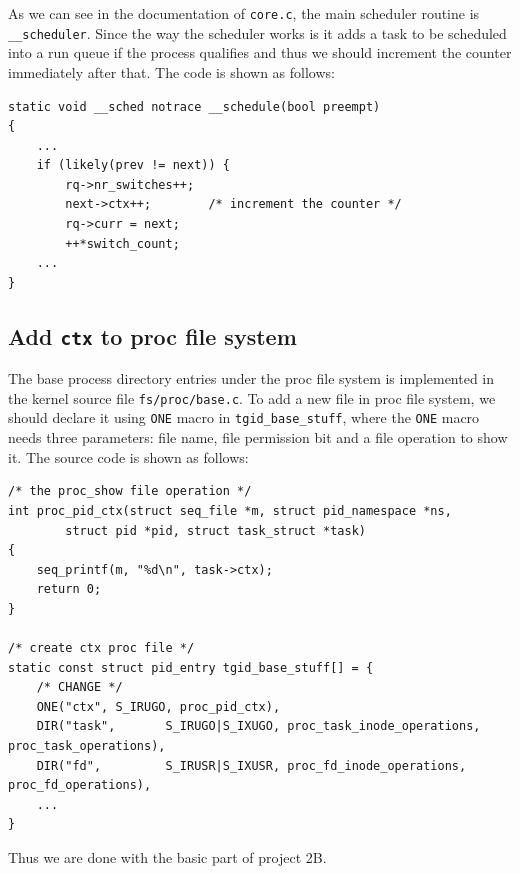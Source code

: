 \documentclass{article}
\begin{document}
As we can see in the documentation of {\tt core.c}, the main scheduler routine is {\tt \_\_scheduler}. Since the way the scheduler works is it adds a task to be scheduled into a run queue if the process qualifies and thus we should increment the counter immediately after that. The code is shown as follows:
\begin{lstlisting}[caption=Increment the counter on scheduling]
static void __sched notrace __schedule(bool preempt)
{
	...
	if (likely(prev != next)) {
		rq->nr_switches++;
		next->ctx++;		/* increment the counter */
		rq->curr = next;
		++*switch_count;
	...
}
\end{lstlisting}

\subsection{Add {\tt ctx} to proc file system}
The base process directory entries under the proc file system is implemented in the kernel source file {\tt fs/proc/base.c}. To add a new file in proc file system, we should declare it using {\tt ONE} macro in {\tt tgid\_base\_stuff}, where the {\tt ONE} macro needs three parameters: file name, file permission bit and a file operation to show it. The source code is shown as follows:
\begin{lstlisting}[caption=Create ctx file under proc file system]
/* the proc_show file operation */
int proc_pid_ctx(struct seq_file *m, struct pid_namespace *ns,
		struct pid *pid, struct task_struct *task)
{
	seq_printf(m, "%d\n", task->ctx);
	return 0;
}

/* create ctx proc file */
static const struct pid_entry tgid_base_stuff[] = {
	/* CHANGE */
	ONE("ctx", S_IRUGO, proc_pid_ctx),
	DIR("task",       S_IRUGO|S_IXUGO, proc_task_inode_operations, proc_task_operations),
	DIR("fd",         S_IRUSR|S_IXUSR, proc_fd_inode_operations, proc_fd_operations),
	...
}
\end{lstlisting}


Thus we are done with the basic part of project 2B.
\end{document}
